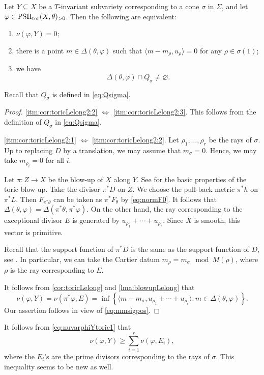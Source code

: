 \begin{corollary}\label{cor:toricLelong2}
    Let $Y\subseteq X$ be a $T$-invariant subvariety corresponding to a cone $\sigma$ in $\Sigma$, and let $\varphi\in \mathrm{PSH}_{\mathrm{tor}}(X,\theta)_{>0}$. Then the following are equivalent:
    \begin{enumerate}
        \item\label{itm:cor:toricLelong2:1} $\nu(\varphi,Y)=0$;
        \item\label{itm:cor:toricLelong2:2} there is a point $m\in \Delta(\theta,\varphi)$ such that $\langle m-m_{\rho},u_{\rho}\rangle=0$ for any $\rho\in \sigma(1)$;
        \item\label{itm:cor:toricLelong2:3} we have
        \[
        \Delta(\theta,\varphi)\cap Q_{\sigma} \neq \varnothing.
        \]
    \end{enumerate}
\end{corollary}
Recall that $Q_{\sigma}$ is defined in \eqref{eq:Qsigma}.
\begin{proof}
    \ref{itm:cor:toricLelong2:2} $\iff$ \ref{itm:cor:toricLelong2:3}. This follows from the definition of $Q_{\sigma}$ in \eqref{eq:Qsigma}.

    \ref{itm:cor:toricLelong2:1} $\iff$ \ref{itm:cor:toricLelong2:2}.
    Let $\rho_1,\ldots,\rho_r$ be the rays of $\sigma$. Up to replacing $D$ by a translation, we may assume that $m_{\sigma}=0$. Hence, we may take $m_{\rho_i}=0$ for all $i$.

    Let $\pi\colon Z\rightarrow X$ be the blow-up of $X$ along $Y$.
    See \cite[Page~132]{CLS11} for the basic properties of the toric blow-up.
    Take the divisor $\pi^*D$ on $Z$.
    We choose the pull-back metric $\pi^*h$ on $\pi^*L$. Then $F_{\pi^*\theta}$ can be taken as $\pi^*F_{\theta}$ by \eqref{eq:normF0}. It follows that $\Delta(\theta,\varphi)=\Delta(\pi^*\theta,\pi^*\varphi)$. On the other hand, the ray corresponding to the exceptional divisor $E$ is generated by $u_{\rho_1}+\cdots+u_{\rho_r}$. Since $X$ is smooth, this vector is primitive.

    Recall that the support function of $\pi^*D$ is the same as the support function of $D$, see \cite[Proposition~6.2.7]{CLS11}.
    In particular, we can take the Cartier datum $m_{\rho}=m_{\sigma} \mod M(\rho)$, where $\rho$ is the ray corresponding to $E$.

    It follows from \cref{cor:toricLelong} and \cref{lma:blowupLelong} that
    \begin{equation}\label{eq:nuvarphiYtoric1}
    \nu(\varphi,Y)=\nu(\pi^*\varphi,E)=
    \inf \left\{ \langle m-m_{\sigma},u_{\rho_1}+\cdots+u_{\rho_r}\rangle:m\in \Delta(\theta,\varphi)\right\}.
    \end{equation}
    Our assertion follows in view of \eqref{eq:mmsigpos}.
\end{proof}
It follows from \eqref{eq:nuvarphiYtoric1} that
\[
\nu(\varphi,Y)\geq \sum_{i=1}^r \nu(\varphi,E_i),
\]
where the $E_i$'s are the prime divisors corresponding to the rays of $\sigma$. This inequality seems to be new as well.



